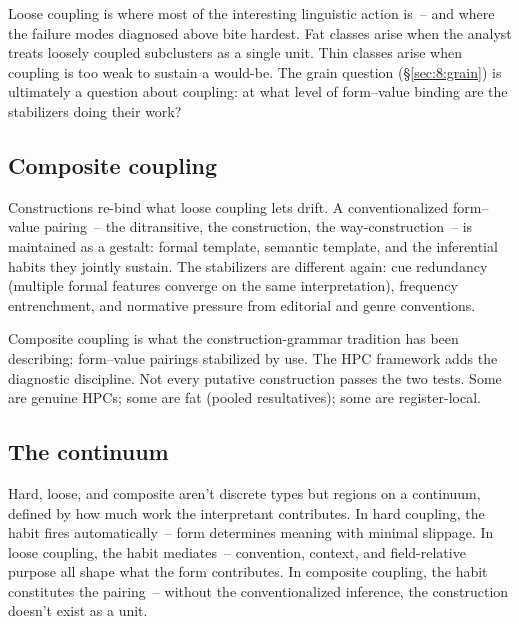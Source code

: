 Loose coupling is where most of the interesting linguistic action is~-- and where the failure modes diagnosed above bite hardest. Fat classes arise when the analyst treats loosely coupled subclusters as a single unit. Thin classes arise when coupling is too weak to sustain a would-be. The grain question (§\ref{sec:8:grain}) is ultimately a question about coupling: at what level of form--value binding are the stabilizers doing their work?

\subsection{Composite coupling}
\label{sec:8:composite-coupling}

Constructions re-bind what loose coupling lets drift. A conventionalized form--value pairing~-- the ditransitive, the  construction, the way-construction~-- is maintained as a gestalt: formal template, semantic template, and the inferential habits they jointly sustain. The stabilizers are different again: cue redundancy (multiple formal features converge on the same interpretation), frequency entrenchment, and normative pressure from editorial and genre conventions.

Composite coupling is what the construction-grammar tradition has been describing: form--value pairings stabilized by use. The HPC framework adds the diagnostic discipline. Not every putative construction passes the two tests. Some are genuine HPCs; some are fat (pooled resultatives); some are register-local.

\subsection{The continuum}
\label{sec:8:continuum}

Hard, loose, and composite aren't discrete types but regions on a continuum, defined by how much work the interpretant contributes. In hard coupling, the habit fires automatically~-- form determines meaning with minimal slippage. In loose coupling, the habit mediates~-- convention, context, and field-relative purpose all shape what the form contributes. In composite coupling, the habit constitutes the pairing~-- without the conventionalized inference, the construction doesn't exist as a unit.

